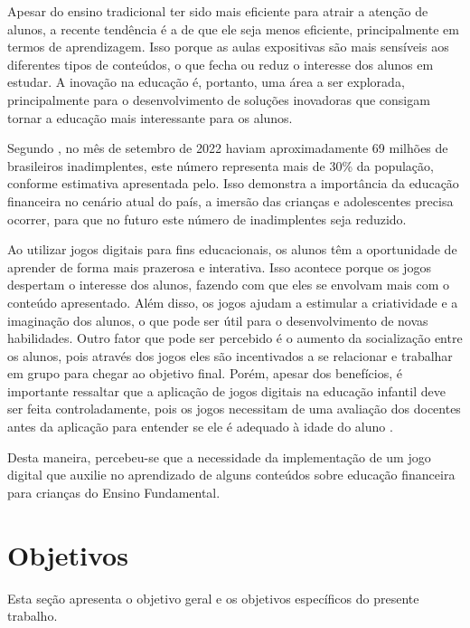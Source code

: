     Apesar do ensino tradicional ter sido mais eficiente para atrair a atenção de alunos, a recente tendência é a de que
    ele seja menos eficiente, principalmente em termos de aprendizagem. Isso porque as aulas expositivas são mais
    sensíveis aos diferentes tipos de conteúdos, o que fecha ou reduz o interesse dos alunos em estudar. A inovação na
    educação é, portanto, uma área a ser explorada, principalmente para o desenvolvimento de soluções inovadoras que
    consigam tornar a educação mais interessante para os alunos.

    Segundo , no mês de setembro de 2022 haviam aproximadamente 69 milhões de brasileiros
    inadimplentes, este número representa mais de 30\% da população, conforme estimativa apresentada
    pelo\cite{IBGE_populacao}. Isso demonstra a importância da educação financeira no cenário atual do país, a imersão
    das crianças e adolescentes precisa ocorrer, para que no futuro este número de inadimplentes seja reduzido.

    Ao utilizar jogos digitais para fins educacionais, os alunos têm a oportunidade de aprender de forma mais prazerosa
    e interativa. Isso acontece porque os jogos despertam o interesse dos alunos, fazendo com que eles se envolvam mais
    com o conteúdo apresentado. Além disso, os jogos ajudam a estimular a criatividade e a imaginação dos alunos, o que
    pode ser útil para o  desenvolvimento de novas habilidades. Outro fator que pode ser percebido é o aumento da
    socialização entre os alunos, pois através dos jogos eles são incentivados a se relacionar e trabalhar em grupo para
    chegar ao objetivo final. Porém, apesar dos benefícios, é importante ressaltar que a aplicação de jogos digitais na
    educação infantil deve ser feita controladamente, pois os jogos necessitam de uma avaliação dos docentes antes da
    aplicação para entender se ele é adequado à idade do aluno \cite{Cruz_Araujo_Andrye_Galvao_Madeira_2022}.

    Desta maneira, percebeu-se que a necessidade da implementação de um jogo digital que auxilie no aprendizado de alguns
    conteúdos sobre educação financeira para crianças do Ensino Fundamental.

    \section{Objetivos}

        Esta seção apresenta o objetivo geral e os objetivos específicos do presente trabalho.

